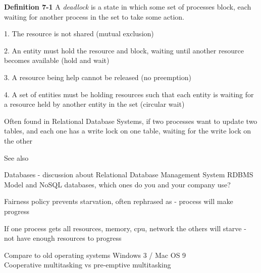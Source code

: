 \documentclass[Screen16to9,17pt]{foils}
\begin{document}
\begin{list1}
\item {\bf Definition 7-1} A \emph{deadlock} is a state in which some set of processes block, each waiting for another process in the set to take some action.
\begin{list2}
\item[1.] The resource is not shared (mutual exclusion)
\item[2.] An entity must hold the resource and block, waiting until another resource becomes available (hold and wait)
\item[3.] A resource being help cannot be released (no preemption)
\item[4.] A set of entities must be holding resources such that each entity is waiting for a resource held by another entity in the set (circular wait)
\end{list2}
\item Often found in Relational Database Systems, if two processes want to update two tables, and each one has a write lock on one table, waiting for the write lock on the other
\item See also 
\end{list1}


Databases - discussion about Relational Database Management System RDBMS Model and NoSQL databases, which ones do you and your company use?



\begin{list1}
\item Fairness policy prevents starvation, often rephrased as - process will make progress
\item If one process gets all resources, memory, cpu, network the others will starve - not have enough resources to progress
\item Compare to old operating systems Windows 3 / Mac OS 9\\
Cooperative multitasking vs pre-emptive multitasking
\end{list1}

\end{document}
